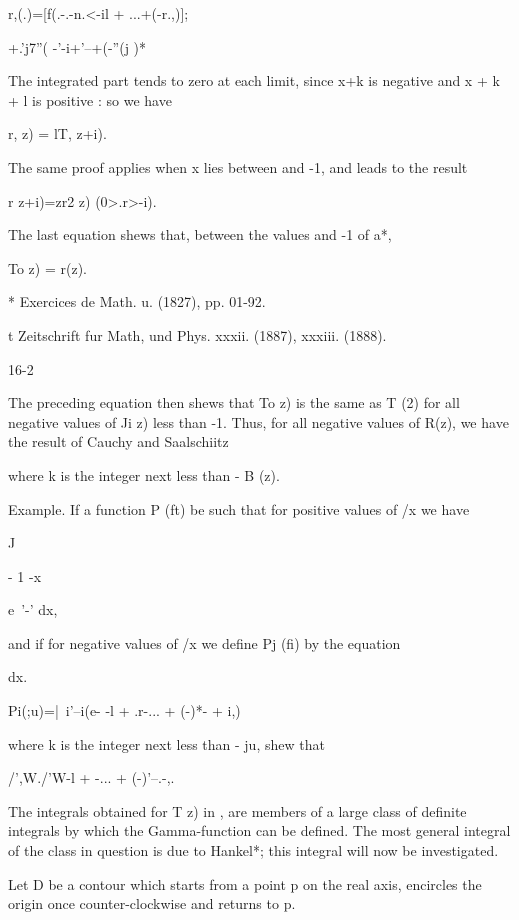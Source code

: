 r,(.)=[f(.-.-n.<-il + ...+(-r.,)];

+.'j7''( -'-i+'--+(-''(j )*

The integrated part tends to zero at each limit, since x+k is negative
and x + k + l is positive : so we have

r, z) = lT, z+i).

The same proof applies when x lies between and -1, and leads to the
result

r z+i)=zr2 z) (0>.r>-i).

The last equation shews that, between the values and -1 of a*,

To z) = r(z).

* Exercices de Math. u. (1827), pp. 01-92.

t Zeitschrift fur Math, und Phys. xxxii. (1887), xxxiii. (1888).

16-2

%
%

The preceding equation then shews that To z) is the same as T (2) for
all negative values of Ji z) less than -1. Thus, for all negative
values of R(z), we have the result of Cauchy and Saalschiitz

where k is the integer next less than - B (z).

Example. If a function P (ft) be such that for positive values of /x
we have

J

- 1 -x

e~'-' dx,

and if for negative values of /x we define Pj (fi) by the equation

dx.

Pi(;u)=|\ i'--i(e- -l + .r-... + (-)*- + i,)

where k is the integer next less than - ju, shew that

/',W./'W-l + -... + (-)'--.-,. 


The integrals obtained for T z) in
,  %
are members of a
large class of definite integrals by which the Gamma-function can be
defined. The most general integral of the class in question is due to
Hankel*; this integral will now be investigated.

Let D be a contour which starts from a point p on the real axis,
encircles the origin once counter-clockwise and returns to p.


